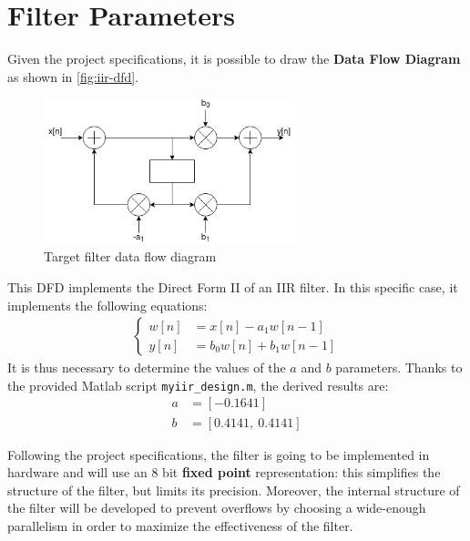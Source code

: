 \section{Filter Parameters}
Given the project specifications, it is possible to draw the \textbf{Data Flow Diagram} as shown in \autoref{fig:iir-dfd}.
\begin{figure}[htbp]
	\centering
	\includegraphics[width=0.65\textwidth]{chapter1/images/iir-dfd.png}
	\caption{Target filter data flow diagram}
	\label{fig:iir-dfd}
\end{figure}

This DFD implements the Direct Form II of an IIR filter. In this specific case, it implements the following equations:
\begin{align}
	\begin{cases}
		w[n] &= x[n] - a_1 w[n-1] 		\\
		y[n] &= b_0 w[n] + b_1 w[n-1]
	\end{cases}
	\label{eqn:iir}
\end{align}
It is thus necessary to determine the values of the $a$ and $b$ parameters. Thanks to the provided Matlab script \texttt{myiir\_design.m}, the derived results are:
\begin{align}
    a &= [-0.1641] \\
    b &= [0.4141,\ 0.4141]
\end{align}

Following the project specifications, the filter is going to be implemented in hardware and will use an 8 bit \textbf{fixed point} representation: this simplifies the structure of the filter, but limits its precision. Moreover, the internal structure of the filter will be developed to prevent overflows by choosing a wide-enough parallelism in order to maximize the effectiveness of the filter.
